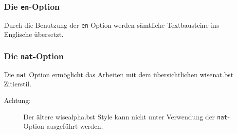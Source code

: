 \documentclass[english, trackchanges, hyperref, ngerman ,pdf, mp, mppdf]{wise}
\newcommand\code[1]{\texttt{#1}}
\begin{document}
\subsubsection{Die \code{en}-Option}
\label{sec:enoption}
Durch die Benutzung der \code{en}-Option werden sämtliche Textbausteine ins Englische übersetzt.



\subsubsection{Die \code{nat}-Option}
\label{sec:natbib}

Die \code{nat} Option ermöglicht das Arbeiten mit dem übersichtlichen wisenat.bst Zitierstil. 


\begin{description}
\item [Achtung:]Der ältere wisealpha.bst Style kann nicht unter Verwendung der \code{nat}-Option ausgeführt werden. 
\end{description}
\end{document}
